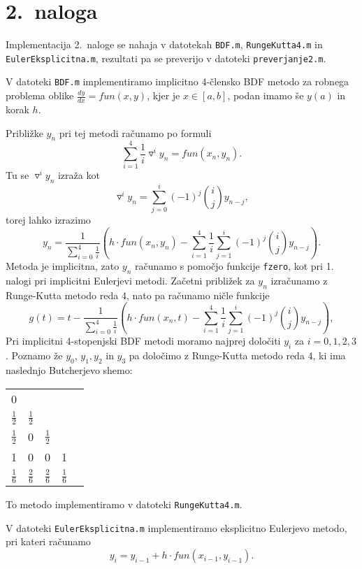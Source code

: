 \documentclass[a4paper,12pt]{article}
\begin{document}
\section*{2.\ naloga}

Implementacija 2.\ naloge se nahaja v datotekah 
\texttt{BDF.m}, \texttt{RungeKutta4.m} in \texttt{EulerEksplicitna.m}, 
rezultati pa se preverijo v datoteki \texttt{preverjanje2.m}.

V datoteki \texttt{BDF.m} implementiramo implicitno 4-člensko BDF
metodo za robnega problema oblike 
\(\frac{dy}{dx}=fun(x,y)\), kjer je \(x\in [a,b]\), podan imamo še \(y(a)\) in korak \(h\).

Približke $y_n$ pri tej metodi računamo po formuli 
$$\sum_{i=1}^4 \frac{1}{i} \triangledown^i y_n = fun(x_n,y_n).$$
Tu se $\triangledown^i y_n$ izraža kot
$$\triangledown^i y_n = \sum_{j=0}^i (-1)^j {i\choose j} y_{n-j},$$
torej lahko izrazimo 
$$y_n = \frac{1}{\sum_{i=0}^4 \frac{1}{i}}(h\cdot fun(x_n,y_n)-
\sum_{i=1}^4 \frac{1}{i}\sum_{j=1}^i (-1)^j{i \choose j}y_{n-j}).$$
Metoda je implicitna, zato $y_n$ računamo s pomočjo funkcije \texttt{fzero}, 
kot pri 1. nalogi
pri implicitni Eulerjevi metodi. Začetni približek za $y_n$ izračunamo
z Runge-Kutta metodo reda 4, nato pa računamo ničle funkcije
$$g(t) =t- \frac{1}{\sum_{i=0}^4 \frac{1}{i}}(h\cdot fun(x_n,t)-
\sum_{i=1}^4 \frac{1}{i}\sum_{j=1}^i (-1)^j{i \choose j}y_{n-j}),$$
Pri implicitni 4-stopenjski BDF metodi moramo najprej določiti 
$y_i$ za $i=0,1,2,3$. Poznamo že $y_0$, $y_1, y_2$ in $y_3$ pa določimo
z Runge-Kutta metodo reda 4, ki ima naslednjo Butcherjevo shemo:
\begin{center}
    \begin{tabular}{c|cccc}
     0&  &  &  &  \\
     $\frac{1}{2}$ & $\frac{1}{2}$ &  &  &  \\
     $\frac{1}{2}$ & 0 & $\frac{1}{2}$ &  &  \\
     1 & 0 & 0 & 1 &  \\ \hline
     $\frac{1}{6}$ & $\frac{2}{6}$ & $\frac{2}{6}$ & $\frac{1}{6}$ & 
    \end{tabular}
\end{center}
To metodo implementiramo v datoteki \texttt{RungeKutta4.m}.

V datoteki \texttt{EulerEksplicitna.m} implementiramo eksplicitno Eulerjevo
metodo, pri kateri računamo
\[y_i=y_{i-1}+h\cdot fun(x_{i-1},y_{i-1}).\]
\end{document}
